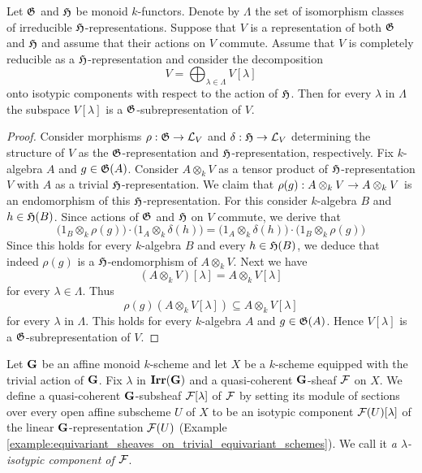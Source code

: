 \begin{proposition}\label{proposition:commuting_action_preserves_isotypic_decomposition}
Let ${\mathfrak G}$ and ${\mathfrak H}$ be monoid $k$-functors. Denote by $\Lambda$ the set of isomorphism classes of irreducible ${\mathfrak H}$-representations. Suppose that $V$ is a representation of both ${\mathfrak G}$ and ${\mathfrak H}$ and assume that their actions on $V$ commute. Assume that $V$ is completely reducible as a ${\mathfrak H}$-representation and consider the decomposition
$$V = \bigoplus_{\lambda\in \Lambda}V[\lambda]$$
onto isotypic components with respect to the action of ${\mathfrak H}$. Then for every $\lambda$ in $\Lambda$ the subspace $V[\lambda]$ is a ${\mathfrak G}$-subrepresentation of $V$.
\end{proposition}
\begin{proof}
Consider morphisms $\rho:{\mathfrak G}\rightarrow {\mathcal L}_V$ and $\delta:{\mathfrak H}\rightarrow {\mathcal L}_V$ determining the structure of $V$ as the ${\mathfrak G}$-representation and ${\mathfrak H}$-representation, respectively. Fix $k$-algebra $A$ and $g\in {\mathfrak G}(A)$. Consider $A\otimes_k V$ as a tensor product of ${\mathfrak H}$-representation $V$ with $A$ as a trivial ${\mathfrak H}$-representation. We claim that $\rho(g):A\otimes_kV \rightarrow A\otimes_kV$ is an endomorphism of this ${\mathfrak H}$-representation. For this consider $k$-algebra $B$ and $h\in {\mathfrak H}(B)$. Since actions of ${\mathfrak G}$ and ${\mathfrak H}$ on $V$ commute, we derive that
$$\big(1_B\otimes_k\rho(g)\big)\cdot \big(1_A\otimes_k\delta(h)\big) = \big(1_A\otimes_k\delta(h)\big)\cdot \big(1_B\otimes_k\rho(g)\big)$$
Since this holds for every $k$-algebra $B$ and every $h\in {\mathfrak H}(B)$, we deduce that indeed $\rho(g)$ is a ${\mathfrak H}$-endomorphism of $A\otimes_kV$. Next we have
$$\left(A\otimes_kV\right)[\lambda] = A\otimes_k V[\lambda]$$
for every $\lambda \in \Lambda$. Thus
$$\rho(g)\left(A \otimes_k V[\lambda] \right)\subseteq A \otimes_k V[\lambda]$$
for every $\lambda$ in $\Lambda$. This holds for every $k$-algebra $A$ and $g\in {\mathfrak G}(A)$. Hence $V[\lambda]$ is a ${\mathfrak G}$-subrepresentation of $V$.
\end{proof}

\begin{definition}
Let $\mathbf{G}$ be an affine monoid $k$-scheme and let $X$ be a $k$-scheme equipped with the trivial action of $\mathbf{G}$. Fix $\lambda$ in $\mathbf{Irr}(\mathbf{G})$ and a quasi-coherent $\mathbf{G}$-sheaf ${\mathcal F}$ on $X$. We define a quasi-coherent $\mathbf{G}$-subsheaf ${\mathcal F}[\lambda]$ of ${\mathcal F}$ by setting its module of sections over every open affine subscheme $U$ of $X$ to be an isotypic component ${\mathcal F}(U)[\lambda]$ of the linear $\mathbf{G}$-representation ${\mathcal F}(U)$ (Example \ref{example:equivariant_sheaves_on_trivial_equivariant_schemes}). We call it \textit{a $\lambda$-isotypic component of ${\mathcal F}$}.
\end{definition}

